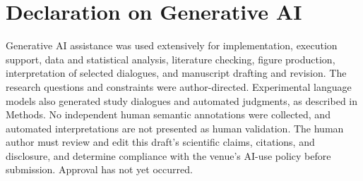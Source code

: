 \documentclass{svproc}
\begin{document}
\section*{Declaration on Generative AI}
Generative AI assistance was used extensively for implementation, execution support, data and statistical analysis, literature checking, figure production, interpretation of selected dialogues, and manuscript drafting and revision. The research questions and constraints were author-directed. Experimental language models also generated study dialogues and automated judgments, as described in Methods. No independent human semantic annotations were collected, and automated interpretations are not presented as human validation. The human author must review and edit this draft's scientific claims, citations, and disclosure, and determine compliance with the venue's AI-use policy before submission. Approval has not yet occurred.
\label{maintextend}
\clearpage
\end{document}
